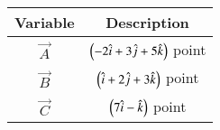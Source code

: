 \begin{tabular}[12pt]{ |c| c|}
    \hline
    \textbf{Variable} & \textbf{Description}\\ 
    \hline
	$\vec{A}$ & $\left(-2\hat{i}+3\hat{j}+5\hat{k}\right)$ point\\
    \hline
	$\vec{B}$ & $\left(\hat{i}+2\hat{j}+3\hat{k}\right)$ point\\
    \hline
	$\vec{C}$ & $\left(7\hat{i}-\hat{k}\right)$ point\\
    \hline

    \end{tabular}
